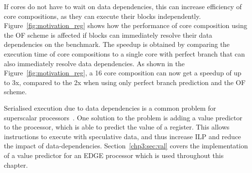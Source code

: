 If cores do not have to wait on data dependencies, this can increase efficiency of core compositions, as they can execute their blocks independently.
Figure~\ref{fig:motivation_reg} shows how the performance of core composition using the OF scheme is affected if blocks can immediately resolve their data dependencies on the  benchmark.
The speedup is obtained by comparing the execution time of core compositions to a single core with perfect branch that can also immediately resolve data dependencies.
As shown in the Figure~\ref{fig:motivation_reg}, a 16 core composition can now get a speedup of up to 3x, compared to the 2x when using only perfect branch prediction and the OF scheme.

Serialised execution due to data dependencies is a common problem for superscalar processors~\cite{peraisVTAGE2014}.
One solution to the problem is adding a value predictor to the processor, which is able to predict the value of a register.
This allows instructions to execute with speculative data, and thus increase ILP and reduce the impact of data-dependencies.
Section~\ref{chp3:sec:val} covers the implementation of a value predictor for an EDGE processor which is used throughout this chapter.






